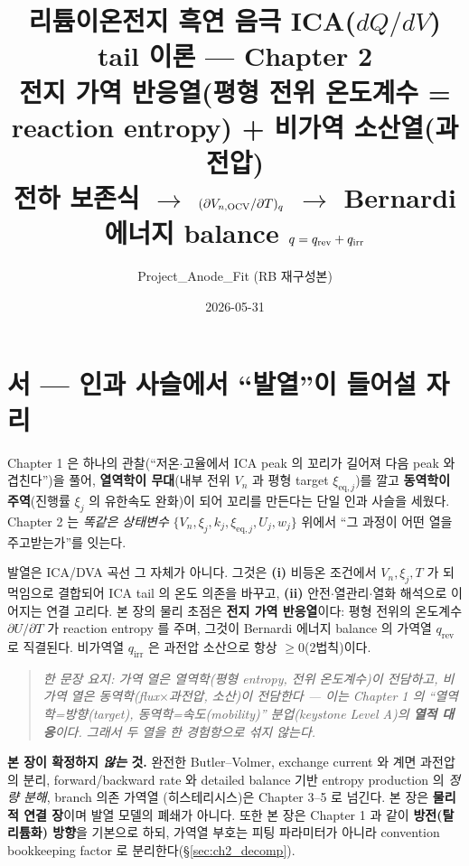 \documentclass[11pt,a4paper]{article}
\title{\textbf{리튬이온전지 흑연 음극 ICA($dQ/dV$) tail 이론 — Chapter 2}\\[0.4em]
\large 전지 가역 반응열(평형 전위 온도계수 = reaction entropy) + 비가역 소산열(과전압)\\[0.2em]
\normalsize 전하 보존식 $\to$ $(\partial V_{n,\mathrm{OCV}}/\partial T)_q$ $\to$ Bernardi 에너지 balance $q=q_\rev+q_\irr$}
\author{Project\_Anode\_Fit (RB 재구성본)}
\date{2026-05-31}
\newcommand{\eq}{\mathrm{eq}}
\newcommand{\irr}{\mathrm{irr}}
\newcommand{\rev}{\mathrm{rev}}
\begin{document}
\maketitle

\section*{서 — 인과 사슬에서 ``발열''이 들어설 자리}
Chapter 1 은 하나의 관찰(``저온$\cdot$고율에서 ICA peak 의 꼬리가 길어져 다음 peak 와 겹친다'')을 풀어,
\textbf{열역학이 무대}(내부 전위 $V_n$ 과 평형 target $\xi_{\eq,j}$)를 깔고 \textbf{동역학이 주역}(진행률 $\xi_j$
의 유한속도 완화)이 되어 꼬리를 만든다는 단일 인과 사슬을 세웠다. Chapter 2 는 \emph{똑같은 상태변수}
$\{V_n,\xi_j,k_j,\xi_{\eq,j},U_j,w_j\}$ 위에서 ``그 과정이 어떤 열을 주고받는가''를 잇는다.

발열은 ICA/DVA 곡선 그 자체가 아니다. 그것은 \textbf{(i)} 비등온 조건에서 $V_n,\xi_j,T$ 가 되먹임으로 결합되어
ICA tail 의 온도 의존을 바꾸고, \textbf{(ii)} 안전$\cdot$열관리$\cdot$열화 해석으로 이어지는 연결 고리다. 본 장의
물리 초점은 \textbf{전지 가역 반응열}이다: 평형 전위의 온도계수 $\partial U/\partial T$ 가 reaction entropy 를
주며, 그것이 Bernardi 에너지 balance 의 가역열 $q_\rev$ 로 직결된다. 비가역열 $q_\irr$ 은 과전압 소산으로
항상 $\ge0$(2법칙)이다.

\begin{quote}\itshape
한 문장 요지: 가역 열은 열역학(평형 entropy, 전위 온도계수)이 전담하고, 비가역 열은 동역학(flux$\times$과전압,
소산)이 전담한다 — 이는 Chapter 1 의 ``열역학=방향(target), 동역학=속도(mobility)'' 분업(keystone Level A)의
\textbf{열적 대응}이다. 그래서 두 열을 한 경험항으로 섞지 않는다.
\end{quote}

\noindent\textbf{본 장이 확정하지 \emph{않는} 것.} 완전한 Butler--Volmer, exchange current 와 계면 과전압의
분리, forward/backward rate 와 detailed balance 기반 entropy production 의 \emph{정량 분해}, branch 의존 가역열
(히스테리시스)은 Chapter 3--5 로 넘긴다. 본 장은 \textbf{물리적 연결 장}이며 발열 모델의 폐쇄가 아니다. 또한 본
장은 Chapter 1 과 같이 \textbf{방전(탈리튬화) 방향}을 기본으로 하되, 가역열 부호는 피팅 파라미터가 아니라
convention bookkeeping factor 로 분리한다(\S\ref{sec:ch2_decomp}).
\end{document}
